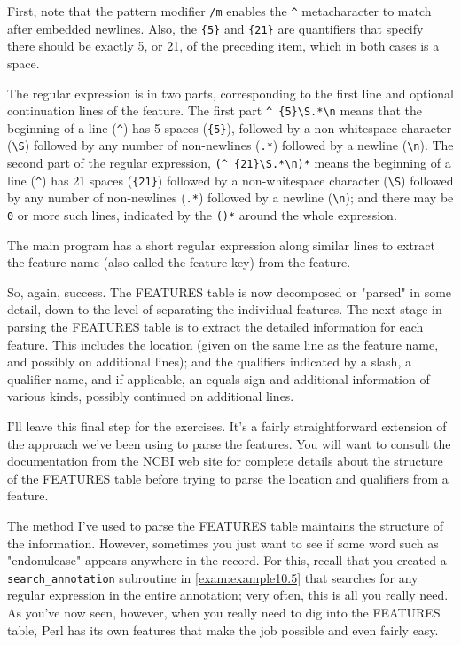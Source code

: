 First, note that the pattern modifier \verb|/m| enables the \verb|^| metacharacter to match after embedded newlines. Also, the \verb|{5}| and \verb|{21}| are quantifiers that specify there should be exactly 5, or 21, of the preceding item, which in both cases is a space. 

The regular expression is in two parts, corresponding to the first line and optional continuation lines of the feature. The first part \verb|^ {5}\S.*\n| means that the beginning of a line (\verb|^|) has 5 spaces (\verb|{5}|), followed by a non-whitespace character (\verb|\S|) followed by any number of non-newlines (\verb|.*|) followed by a newline (\verb|\n|). The second part of the regular expression, \verb|(^ {21}\S.*\n)*| means the beginning of a line (\verb|^|) has 21 spaces (\verb|{21}|) followed by a non-whitespace character (\verb|\S|) followed by any number of non-newlines (\verb|.*|) followed by a newline (\verb|\n|); and there may be \verb|0| or more such lines, indicated by the \verb|()*| around the whole expression. 

The main program has a short regular expression along similar lines to extract the feature name (also called the feature key) from the feature.

So, again, success. The FEATURES table is now decomposed or "parsed" in some detail, down to the level of separating the individual features.  The next stage in parsing the FEATURES table is to extract the detailed information for each feature. This includes the location (given on the same line as the feature name, and possibly on additional lines); and the qualifiers indicated by a slash, a qualifier name, and if applicable, an equals sign and additional information of various kinds, possibly continued on additional lines.

I'll leave this final step for the exercises. It's a fairly straightforward extension of the approach we've been using to parse the features. You will want to consult the documentation from the NCBI web site for complete details about the structure of the FEATURES table before trying to parse the location and qualifiers from a feature.

The method I've used to parse the FEATURES table maintains the structure of the information. However, sometimes you just want to see if some word such as "endonulease" appears anywhere in the record. For this, recall that you created a \verb|search_annotation| subroutine in \autoref{exam:example10.5} that searches for any regular expression in the entire annotation; very often, this is all you really need. As you've now seen, however, when you really need to dig into the FEATURES table, Perl has its own features that make the job possible and even fairly easy. 

